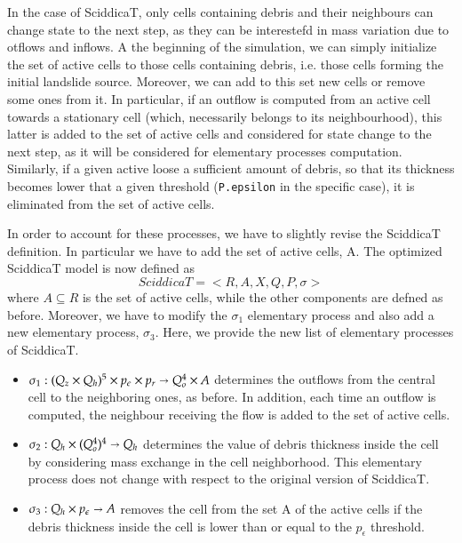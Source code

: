 In the case of SciddicaT, only cells containing debris and their
neighbours can change state to the next step, as they can be
interestefd in mass variation due to otflows and inflows. A the
beginning of the simulation, we can simply initialize the set of
active cells to those cells containing debris, i.e. those cells
forming the initial landslide source. Moreover, we can add to this set
new cells or remove some ones from it. In particular, if an outflow is
computed from an active cell towards a stationary cell (which,
necessarily belongs to its neighbourhood), this latter is added to the
set of active cells and considered for state change to the next step,
as it will be considered for elementary processes
computation. Similarly, if a given active loose a sufficient amount of
debris, so that its thickness becomes lower that a given threshold
(\verb'P.epsilon' in the specific case), it is eliminated from the set
of active cells.

In order to account for these processes, we have to slightly revise
the SciddicaT definition. In particular we have to add the set of
active cells, A. The optimized SciddicaT model is now defined as
$$SciddicaT = < R, A, X, Q , P, \sigma >$$ where $A \subseteq R$ is
the set of active cells, while the other components are defned as
before. Moreover, we have to modify the $\sigma_1$ elementary process
and also add a new elementary process, $\sigma_3$. Here, we provide
the new list of elementary processes of SciddicaT.

\begin{itemize}
\item $\sigma_1 : (Q_z \times Q_h)^5 \times p_\epsilon \times p_r
  \shortrightarrow Q_o^4 \times A$ determines the outflows from the
  central cell to the neighboring ones, as before. In addition, each
  time an outflow is computed, the neighbour receiving the flow is
  added to the set of active cells.

\item $\sigma_2: Q_h \times (Q_o^4)^4 \shortrightarrow Q_h$ determines
  the value of debris thickness inside the cell by considering mass
  exchange in the cell neighborhood. This elementary process does not
  change with respect to the original version of SciddicaT.

\item $\sigma_3: Q_h \times p_\epsilon \shortrightarrow A$ removes the
  cell from the set A of the active cells if the debris thickness
  inside the cell is lower than or equal to the $p_\epsilon$
  threshold.
\end{itemize}

